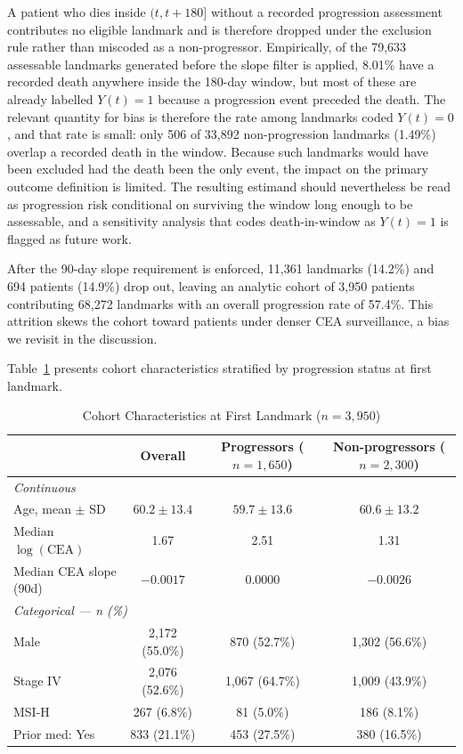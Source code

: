 \documentclass[11pt]{article}
\begin{document}
A patient who dies inside $(t, t+180]$ without a recorded progression assessment contributes no eligible landmark and is therefore dropped under the exclusion rule rather than miscoded as a non-progressor. Empirically, of the 79{,}633 assessable landmarks generated before the slope filter is applied, 8.01\% have a recorded death anywhere inside the 180-day window, but most of these are already labelled $Y(t)=1$ because a progression event preceded the death. The relevant quantity for bias is therefore the rate among landmarks coded $Y(t)=0$, and that rate is small: only 506 of 33{,}892 non-progression landmarks (1.49\%) overlap a recorded death in the window. Because such landmarks would have been excluded had the death been the only event, the impact on the primary outcome definition is limited. The resulting estimand should nevertheless be read as progression risk conditional on surviving the window long enough to be assessable, and a sensitivity analysis that codes death-in-window as $Y(t)=1$ is flagged as future work.

After the 90-day slope requirement is enforced, 11{,}361 landmarks (14.2\%) and 694 patients (14.9\%) drop out, leaving an analytic cohort of 3{,}950 patients contributing 68{,}272 landmarks with an overall progression rate of 57.4\%. This attrition skews the cohort toward patients under denser CEA surveillance, a bias we revisit in the discussion.

Table~\ref{tab:cohort} presents cohort characteristics stratified by progression status at first landmark.

\begin{table}[H]
\centering
\caption{Cohort Characteristics at First Landmark ($n = 3{,}950$)}
\label{tab:cohort}
\small
\begin{tabular}{lccc}
\toprule
 & Overall & Progressors ($n = 1{,}650$) & Non-progressors ($n = 2{,}300$) \\
\midrule
\multicolumn{4}{l}{\textit{Continuous}} \\
Age, mean $\pm$ SD & $60.2 \pm 13.4$ & $59.7 \pm 13.6$ & $60.6 \pm 13.2$ \\
Median $\log(\text{CEA})$ & 1.67 & 2.51 & 1.31 \\
Median CEA slope (90d) & $-0.0017$ & 0.0000 & $-0.0026$ \\
\midrule
\multicolumn{4}{l}{\textit{Categorical --- n (\%)}} \\
Male & 2,172 (55.0\%) & 870 (52.7\%) & 1,302 (56.6\%) \\
Stage IV & 2,076 (52.6\%) & 1,067 (64.7\%) & 1,009 (43.9\%) \\
MSI-H & 267 (6.8\%) & 81 (5.0\%) & 186 (8.1\%) \\
Prior med: Yes & 833 (21.1\%) & 453 (27.5\%) & 380 (16.5\%) \\
\bottomrule
\end{tabular}
\end{table}
\end{document}
